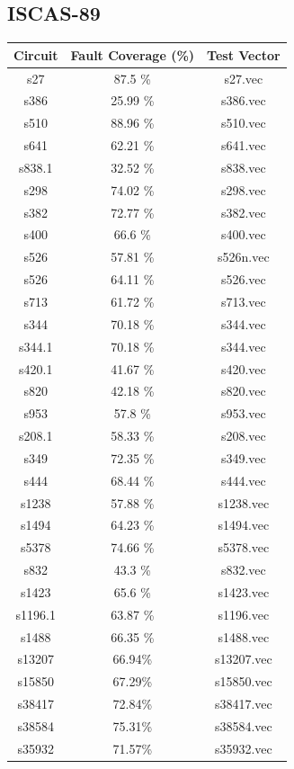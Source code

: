 \documentclass[a4paper,12pt]{article}
\begin{document}
\subsection*{ISCAS-89}
\begin{center}
\begin{tabular}{||c c c||}
\hline
Circuit & Fault Coverage (\%) & Test Vector \\ [0.5ex] 
\hline\hline
s27 & 87.5 \%  & s27.vec \\ 
\hline
s386 & 25.99 \%  & s386.vec \\ 
\hline
s510 & 88.96 \%  & s510.vec \\ 
\hline
s641 & 62.21 \%  & s641.vec \\ 
\hline
s838.1 & 32.52 \%  & s838.vec \\ 
\hline
s298 & 74.02 \%  & s298.vec \\ 
\hline
s382 & 72.77 \%  & s382.vec \\ 
\hline
s400 & 66.6 \%  & s400.vec \\ 
\hline
s526 & 57.81 \%  & s526n.vec \\ 
\hline
s526 & 64.11 \%  & s526.vec \\ 
\hline
s713 & 61.72 \%  & s713.vec \\ 
\hline
s344 & 70.18 \%  & s344.vec \\ 
\hline
s344.1 & 70.18 \%  & s344.vec \\ 
\hline
s420.1 & 41.67 \%  & s420.vec \\ 
\hline
s820 & 42.18 \%  & s820.vec \\ 
\hline
s953 & 57.8 \%  & s953.vec \\ 
\hline
s208.1 & 58.33 \%  & s208.vec \\ 
\hline
s349 & 72.35 \%  & s349.vec \\ 
\hline
s444 & 68.44 \%  & s444.vec \\ 
\hline
s1238 & 57.88 \%  & s1238.vec \\ 
\hline
s1494 & 64.23 \%  & s1494.vec \\ 
\hline
s5378 & 74.66 \%  & s5378.vec \\ 
\hline
s832 & 43.3 \%  & s832.vec \\ 
\hline
s1423 & 65.6 \%  & s1423.vec \\ 
\hline
s1196.1 & 63.87 \%  & s1196.vec \\ 
\hline
s1488 & 66.35 \%  & s1488.vec \\ 
\hline
s13207 & 66.94\% & s13207.vec \\
\hline
s15850 & 67.29\% & s15850.vec \\
\hline
s38417 & 72.84\% & s38417.vec \\
\hline
s38584 & 75.31\% & s38584.vec \\
\hline
s35932 & 71.57\% & s35932.vec \\
\hline
\hline
\end{tabular}
\end{center}
\end{document}
